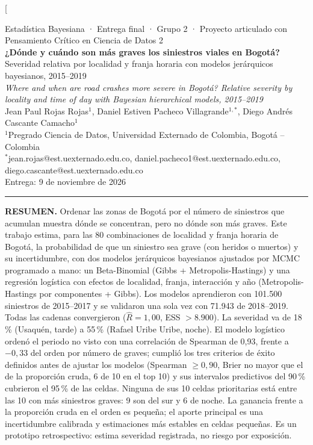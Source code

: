 \documentclass[10pt,twocolumn]{article}
\begin{document}
\twocolumn[{
\begin{center}
{\small Estadística Bayesiana · Entrega final · Grupo 2 · Proyecto articulado con Pensamiento Crítico en Ciencia de Datos 2}\\[6pt]
{\LARGE\bfseries ¿Dónde y cuándo son más graves los siniestros viales en Bogotá?}\\[3pt]
{\large Severidad relativa por localidad y franja horaria con modelos jerárquicos bayesianos, 2015--2019}\\[5pt]
{\large\itshape Where and when are road crashes more severe in Bogotá? Relative severity by locality and time of day with Bayesian hierarchical models, 2015--2019}\\[8pt]
Jean Paul Rojas Rojas$^{1}$, Daniel Estiven Pacheco Villagrande$^{1,*}$, Diego Andrés Cascante Camacho$^{1}$\\[2pt]
{\small $^{1}$Pregrado Ciencia de Datos, Universidad Externado de Colombia, Bogotá -- Colombia}\\
{\small $^{*}$jean.rojas@est.uexternado.edu.co, daniel.pacheco1@est.uexternado.edu.co, diego.cascante@est.uexternado.edu.co}\\[4pt]
{\small Entrega: 9 de noviembre de 2026}
\end{center}
\vspace{2pt}
\noindent\rule{\textwidth}{0.4pt}
\begin{small}
\noindent\textbf{RESUMEN.} Ordenar las zonas de Bogotá por el número de siniestros que acumulan muestra dónde se concentran, pero no dónde son más graves. Este trabajo estima, para las 80 combinaciones de localidad y franja horaria de Bogotá, la probabilidad de que un siniestro sea grave (con heridos o muertos) y su incertidumbre, con dos modelos jerárquicos bayesianos ajustados por MCMC programado a mano: un Beta-Binomial (Gibbs + Metropolis-Hastings) y una regresión logística con efectos de localidad, franja, interacción y año (Metropolis-Hastings por componentes + Gibbs). Los modelos aprendieron con 101.500 siniestros de 2015--2017 y se validaron una sola vez con 71.943 de 2018--2019. Todas las cadenas convergieron ($\widehat R=1{,}00$, ESS $>8.900$). La severidad va de 18\,\% (Usaquén, tarde) a 55\,\% (Rafael Uribe Uribe, noche). El modelo logístico ordenó el periodo no visto con una correlación de Spearman de 0,93, frente a $-0{,}33$ del orden por número de graves; cumplió los tres criterios de éxito definidos antes de ajustar los modelos (Spearman $\ge0{,}90$, Brier no mayor que el de la proporción cruda, 6 de 10 en el top 10) y sus intervalos predictivos del 90\,\% cubrieron el 95\,\% de las celdas. Ninguna de sus 10 celdas prioritarias está entre las 10 con más siniestros graves: 9 son del sur y 6 de noche. La ganancia frente a la proporción cruda en el orden es pequeña; el aporte principal es una incertidumbre calibrada y estimaciones más estables en celdas pequeñas. Es un prototipo retrospectivo: estima severidad registrada, no riesgo por exposición.

\end{small}}
\end{document}

